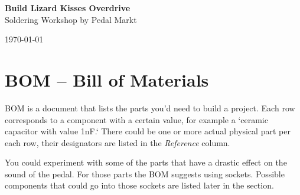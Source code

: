 \documentclass[a4paper,12pt]{article}
\begin{document}
\begin{titlepage}
  \begin{center}
    \Large\textbf{Build Lizard Kisses Overdrive}\\
    \large{Soldering Workshop by Pedal Markt}
  \end{center}
  \vspace*{\fill}
  \begin{center}
    \today
  \end{center}
\end{titlepage}

\section{BOM – Bill of Materials}

BOM is a document that lists the parts you'd need to build a
project. Each row corresponds to a component with a certain
value, for example a `ceramic capacitor with value 1nF.`
There could be one or more actual physical part per each
row, their designators are listed in the \textit{Reference}
column.

You could experiment with some of the parts that have a
drastic effect on the sound of the pedal. For those parts
the BOM suggests using sockets. Possible components that
could go into those sockets are listed later in the section.

\end{document}
